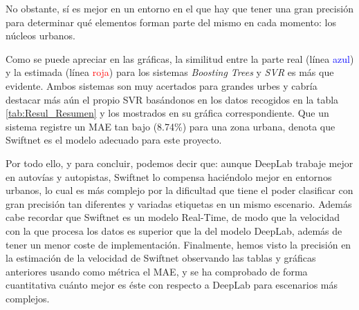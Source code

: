 No obstante, sí es mejor en un entorno en el que hay que tener una gran precisión para determinar qué elementos forman parte del mismo en cada momento: los núcleos urbanos.

Como se puede apreciar en las gráficas, la similitud entre la parte real (línea \textcolor{blue}{azul}) y la estimada (línea \textcolor{red}{roja}) para los sistemas \textit{Boosting Trees} y \textit{\ac{SVR}} es más que evidente. Ambos sistemas son muy acertados para grandes urbes y cabría destacar más aún el propio \ac{SVR} basándonos en los datos recogidos en la tabla \ref{tab:Resul_Resumen} y los mostrados en su gráfica correspondiente. Que un sistema registre un \ac{MAE} tan bajo (8.74\%) para una zona urbana, denota que Swiftnet es el modelo adecuado para este proyecto.



Por todo ello, y para concluir, podemos decir que: aunque DeepLab trabaje mejor en autovías y autopistas, Swiftnet lo compensa haciéndolo mejor en entornos urbanos, lo cual es más complejo por la dificultad que tiene el poder clasificar con gran precisión tan diferentes y variadas etiquetas en un mismo escenario. Además cabe recordar que Swiftnet es un modelo Real-Time, de modo que la velocidad con la que procesa los datos es superior que la del modelo DeepLab, además de tener un menor coste de implementación. Finalmente, hemos visto la precisión en la estimación de la velocidad de Swiftnet observando las tablas y gráficas anteriores usando como métrica el \ac{MAE}, y se ha comprobado de forma cuantitativa cuánto mejor es éste con respecto a DeepLab para escenarios más complejos.
